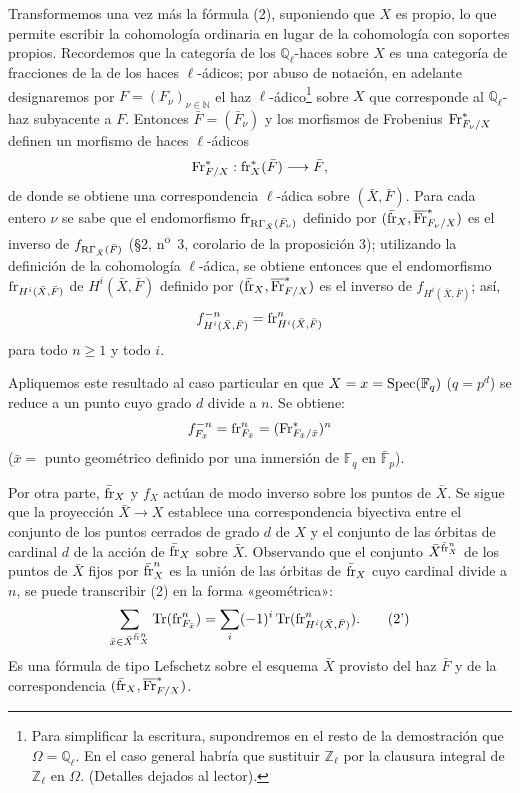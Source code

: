 Transformemos una vez más la fórmula (2), suponiendo que $X$ es propio, lo que permite escribir la cohomología ordinaria en lugar de la cohomología con soportes propios. Recordemos que la categoría de los $\mathbb Q_\ell$-haces sobre $X$ es una categoría de fracciones de la de los haces $\ell$-ádicos; por abuso de notación, en adelante designaremos por $F=(F_\nu)_{\nu\in\mathbb N}$ el haz $\ell$-ádico\footnote{Para simplificar la escritura, supondremos en el resto de la demostración que $\Omega=\mathbb Q_\ell$. En el caso general habría que sustituir $\mathbb Z_\ell$ por la clausura integral de $\mathbb Z_\ell$ en $\Omega$. (Detalles dejados al lector).} sobre $X$ que corresponde al $\mathbb Q_\ell$-haz subyacente a $F$. Entonces $\bar F=(\bar F_\nu)$ y los morfismos de Frobenius $\operatorname{Fr}^*_{F_\nu/X}$ definen un morfismo de haces $\ell$-ádicos
\[
\operatorname{Fr}^*_{F/X}:\operatorname{fr}_X^*(\bar F)\longrightarrow\bar F,
\]
de donde se obtiene una correspondencia $\ell$-ádica sobre $(\bar X,\bar F)$. Para cada entero $\nu$ se sabe que el endomorfismo $\operatorname{fr}_{\mathrm{R}\Gamma_{\bar X}(\bar F_\nu)}$ definido por $(\bar{\operatorname{fr}}_X,\overline{\operatorname{Fr}}^*_{F_\nu/X})$ es el inverso de $f_{\mathrm{R}\Gamma_{\bar X}(\bar F)}$ (§2, n\textsuperscript{o}~3, corolario de la proposición 3); utilizando la definición de la cohomología $\ell$-ádica, se obtiene entonces que el endomorfismo $\operatorname{fr}_{H^i(\bar X,\bar F)}$ de $H^i(\bar X,\bar F)$ definido por $(\bar{\operatorname{fr}}_X,\overline{\operatorname{Fr}}^*_{F/X})$ es el inverso de $f_{H^i(\bar X,\bar F)}$; así,
\[
f^{-n}_{H^i(\bar X,\bar F)}=\operatorname{fr}^n_{H^i(\bar X,\bar F)}
\]
para todo $n\ge1$ y todo $i$.

Apliquemos este resultado al caso particular en que $X=x=\operatorname{Spec}(\mathbb F_q)$ ($q=p^d$) se reduce a un punto cuyo grado $d$ divide a $n$. Se obtiene:
\[
f^{-n}_{F_{\bar x}}=\operatorname{fr}^n_{F_{\bar x}}=(\operatorname{Fr}^*_{F_{\bar x}/\bar x})^n
\]
($\bar x=$ punto geométrico definido por una inmersión de $\mathbb F_q$ en $\bar{\mathbb F}_p$).

Por otra parte, $\bar{\operatorname{fr}}_X$ y $f_X$ actúan de modo inverso sobre los puntos de $\bar X$. Se sigue que la proyección $\bar X\to X$ establece una correspondencia biyectiva entre el conjunto de los puntos cerrados de grado $d$ de $X$ y el conjunto de las órbitas de cardinal $d$ de la acción de $\bar{\operatorname{fr}}_X$ sobre $\bar X$. Observando que el conjunto $\bar X^{\bar{\operatorname{fr}}_X^n}$ de los puntos de $\bar X$ fijos por $\bar{\operatorname{fr}}_X^n$ es la unión de las órbitas de $\bar{\operatorname{fr}}_X$ cuyo cardinal divide a $n$, se puede transcribir (2) en la forma «geométrica»:
\[
\sum_{\bar x\in\bar X^{\bar{\operatorname{fr}}_X^n}}\operatorname{Tr}(\operatorname{fr}^n_{F_{\bar x}})
=\sum_i(-1)^i\operatorname{Tr}(\operatorname{fr}^n_{H^i(\bar X,\bar F)}).
\tag{2'}
\]
Es una fórmula de tipo Lefschetz sobre el esquema $\bar X$ provisto del haz $\bar F$ y de la correspondencia $(\bar{\operatorname{fr}}_X,\overline{\operatorname{Fr}}^*_{F/X})$.
